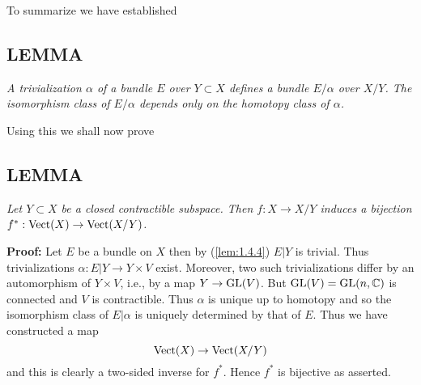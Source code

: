 To summarize we have established \par

\subsection{LEMMA}\label{lem:1.4.7} \textit{A trivialization $\alpha$ of a bundle $E$ over $Y \subset X$ defines a bundle $E/\alpha$ over $X/Y$. The isomorphism class of $E/\alpha$ depends only on the homotopy class of $\alpha$.} \par 

Using this we shall now prove \par

\subsection{LEMMA}\label{lem:1.4.8} \textit{Let $Y \subset X$ be a closed contractible subspace. Then $f: X \to X/Y$ induces a bijection $f^*: \operatorname{Vect}(X) \to \operatorname{Vect}(X/Y)$.} \par 

\textbf{Proof:} Let $E$ be a bundle on $X$ then by (\ref{lem:1.4.4}) $E \vert Y$ is trivial. Thus trivializations $\alpha: E \vert Y \to Y \times V$ exist. Moreover, two such trivializations differ by an automorphism of $Y \times V$, i.e., by a map $Y \to \operatorname{GL}(V)$. But $\operatorname{GL}(V) = \operatorname{GL}(n, \mathbb{C})$ is connected and $V$ is contractible. Thus $\alpha$ is unique up to homotopy and so the isomorphism class of $E \vert \alpha$ is uniquely determined by that of $E$. Thus we have constructed a map
\begin{equation*}
    \operatorname{Vect}(X) \to \operatorname{Vect}(X/Y)
\end{equation*}
and this is clearly a two-sided inverse for $f^*$. Hence $f^*$ is bijective as asserted. \par \hfill

